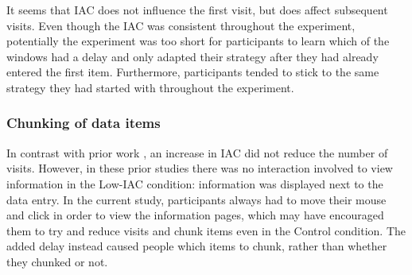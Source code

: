 It seems that IAC does not influence the first visit, but does affect subsequent visits. Even though the IAC was consistent throughout the experiment, potentially the experiment was too short for participants to learn which of the windows had a delay and only adapted their strategy after they had already entered the first item. Furthermore, participants tended to stick to the same strategy they had started with throughout the experiment.

\subsubsection{Chunking of data items}
In contrast with prior work \citep{Gray2006}, an increase in IAC did not reduce the number of visits. However, in these prior studies there was no interaction involved to view information in the Low-IAC condition: information was displayed next to the data entry. In the current study, participants always had to move their mouse and click in order to view the information pages, which may have encouraged them to try and reduce visits and chunk items even in the Control condition. The added delay instead caused people which items to chunk, rather than whether they chunked or not. 





